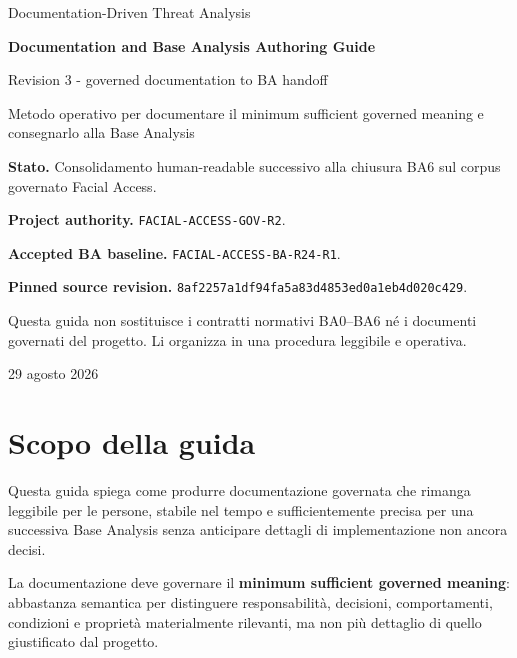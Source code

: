 \documentclass[11pt,a4paper]{article}
\newcommand{\code}[1]{\nolinkurl{#1}}
\begin{document}
\begin{titlepage}
\centering
\vspace*{1.5cm}
{\Large Documentation-Driven Threat Analysis\par}
\vspace{0.8cm}
{\Huge\bfseries Documentation and Base Analysis Authoring Guide\par}
\vspace{0.25cm}
{\LARGE Revision 3 - governed documentation to BA handoff\par}
\vspace{0.9cm}
{\large Metodo operativo per documentare il minimum sufficient governed meaning e consegnarlo alla Base Analysis\par}
\vfill
\begin{minipage}{0.88\textwidth}
\small
\textbf{Stato.} Consolidamento human-readable successivo alla chiusura BA6 sul corpus governato Facial Access.

\medskip
\textbf{Project authority.} \code{FACIAL-ACCESS-GOV-R2}.

\medskip
\textbf{Accepted BA baseline.} \code{FACIAL-ACCESS-BA-R24-R1}.

\medskip
\textbf{Pinned source revision.} \code{8af2257a1df94fa5a83d4853ed0a1eb4d020c429}.

\medskip
Questa guida non sostituisce i contratti normativi BA0--BA6 né i documenti governati del progetto. Li organizza in una procedura leggibile e operativa.
\end{minipage}
\vfill
{\large 29 agosto 2026\par}
\end{titlepage}

\tableofcontents
\newpage
{}

\section{Scopo della guida}

Questa guida spiega come produrre documentazione governata che rimanga leggibile per le persone, stabile nel tempo e sufficientemente precisa per una successiva Base Analysis senza anticipare dettagli di implementazione non ancora decisi.

\begin{closedbox}
La documentazione deve governare il \textbf{minimum sufficient governed meaning}: abbastanza semantica per distinguere responsabilità, decisioni, comportamenti, condizioni e proprietà materialmente rilevanti, ma non più dettaglio di quello giustificato dal progetto.
\end{closedbox}
\end{document}
